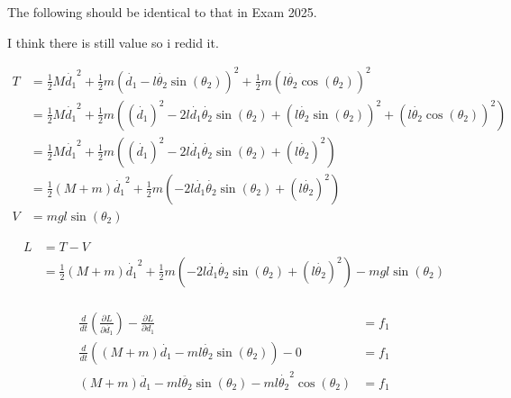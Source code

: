 \begin{solutionbox}[Q1-4]
    The following should be identical to that in Exam 2025.

    I think there is still value so i redid it.

    \begin{align*}
        T & =\frac{1}{2}M\dot{d_1}^2 + \frac{1}{2}m(\dot{d_1}-l\dot{\theta_2}\sin(\theta_2))^2+\frac{1}{2}m(l\dot{\theta_2}\cos(\theta_2))^2                                              \\
          & =\frac{1}{2}M\dot{d_1}^2 + \frac{1}{2}m\left((\dot{d_1})^2-2l\dot{d_1}\dot{\theta_2}\sin(\theta_2)+(l\dot{\theta_2}\sin(\theta_2))^2+(l\dot{\theta_2}\cos(\theta_2))^2\right) \\
          & =\frac{1}{2}M\dot{d_1}^2 + \frac{1}{2}m\left((\dot{d_1})^2-2l\dot{d_1}\dot{\theta_2}\sin(\theta_2)+(l\dot{\theta_2})^2 \right)                                                \\
          & =\frac{1}{2}(M+m)\dot{d_1}^2 + \frac{1}{2}m\left(-2l\dot{d_1}\dot{\theta_2}\sin(\theta_2)+(l\dot{\theta_2})^2 \right)                                                         \\
        V & =mgl\sin(\theta_2)
    \end{align*}

    \begin{align*}
        L & =T-V                                                                                                                                    \\
          & =\frac{1}{2}(M+m)\dot{d_1}^2 + \frac{1}{2}m\left(-2l\dot{d_1}\dot{\theta_2}\sin(\theta_2)+(l\dot{\theta_2})^2 \right)-mgl\sin(\theta_2) \\
    \end{align*}

    \begin{align*}
        \frac{d}{dt} \left(\frac{\partial L}{\partial \dot{d_1}} \right) - \frac{\partial L}{\partial d_1} & = f_1 \\
        \frac{d}{dt} \left( (M+m)\dot{d_1} -ml\dot{\theta_2}\sin(\theta_2) \right) -0                      & = f_1 \\
        (M+m)\ddot{d_1} -ml\ddot{\theta_2}\sin(\theta_2)-ml\dot{\theta_2}^2\cos(\theta_2)                  & = f_1 \\
    \end{align*}


\end{solutionbox}
